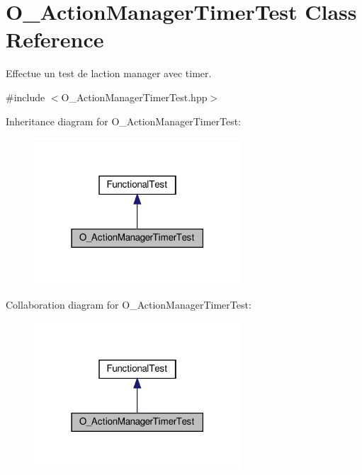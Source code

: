 \hypertarget{classO__ActionManagerTimerTest}{}\section{O\+\_\+\+Action\+Manager\+Timer\+Test Class Reference}
\label{classO__ActionManagerTimerTest}


Effectue un test de l\textquotesingle{}action manager avec timer.  




{\ttfamily \#include $<$O\+\_\+\+Action\+Manager\+Timer\+Test.\+hpp$>$}



Inheritance diagram for O\+\_\+\+Action\+Manager\+Timer\+Test\+:
\nopagebreak
\begin{figure}[H]
\begin{center}
\leavevmode
\includegraphics[width=219pt]{classO__ActionManagerTimerTest__inherit__graph}
\end{center}
\end{figure}


Collaboration diagram for O\+\_\+\+Action\+Manager\+Timer\+Test\+:
\nopagebreak
\begin{figure}[H]
\begin{center}
\leavevmode
\includegraphics[width=219pt]{classO__ActionManagerTimerTest__coll__graph}
\end{center}
\end{figure}
